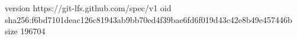 version https://git-lfs.github.com/spec/v1
oid sha256:f6bd7101deac126c81943ab9bb70ed4f39bae6fd6f019d43c42e8b49e457446b
size 196704
